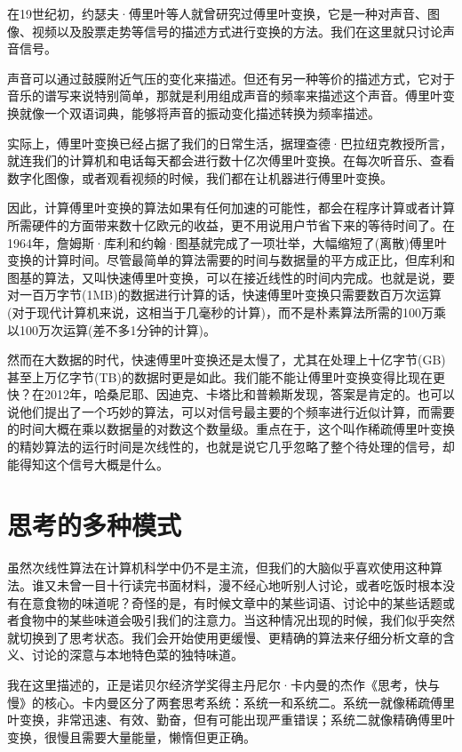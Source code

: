 在19世纪初，约瑟夫·傅里叶等人就曾研究过傅里叶变换，它是一种对声音、图像、视频以及股票走势等信号的描述方式进行变换的方法。我们在这里就只讨论声音信号。

声音可以通过鼓膜附近气压的变化来描述。但还有另一种等价的描述方式，它对于音乐的谱写来说特别简单，那就是利用组成声音的频率来描述这个声音。傅里叶变换就像一个双语词典，能够将声音的振动变化描述转换为频率描述。

实际上，傅里叶变换已经占据了我们的日常生活，据理查德·巴拉纽克教授所言，就连我们的计算机和电话每天都会进行数十亿次傅里叶变换。在每次听音乐、查看数字化图像，或者观看视频的时候，我们都在让机器进行傅里叶变换。

因此，计算傅里叶变换的算法如果有任何加速的可能性，都会在程序计算或者计算所需硬件的方面带来数十亿欧元的收益，更不用说用户节省下来的等待时间了。在1964年，詹姆斯·库利和约翰·图基就完成了一项壮举，大幅缩短了(离散)傅里叶变换的计算时间。尽管最简单的算法需要的时间与数据量的平方成正比，但库利和图基的算法，又叫快速傅里叶变换，可以在接近线性的时间内完成。也就是说，要对一百万字节(1MB)的数据进行计算的话，快速傅里叶变换只需要数百万次运算(对于现代计算机来说，这相当于几毫秒的计算)，而不是朴素算法所需的100万乘以100万次运算(差不多1分钟的计算)。

然而在大数据的时代，快速傅里叶变换还是太慢了，尤其在处理上十亿字节(GB)甚至上万亿字节(TB)的数据时更是如此。我们能不能让傅里叶变换变得比现在更快？在2012年，哈桑尼耶、因迪克、卡塔比和普赖斯发现，答案是肯定的。也可以说他们提出了一个巧妙的算法，可以对信号最主要的个频率进行近似计算，而需要的时间大概在乘以数据量的对数这个数量级。重点在于，这个叫作稀疏傅里叶变换的精妙算法的运行时间是次线性的，也就是说它几乎忽略了整个待处理的信号，却能得知这个信号大概是什么。

\section{思考的多种模式}

虽然次线性算法在计算机科学中仍不是主流，但我们的大脑似乎喜欢使用这种算法。谁又未曾一目十行读完书面材料，漫不经心地听别人讨论，或者吃饭时根本没有在意食物的味道呢？奇怪的是，有时候文章中的某些词语、讨论中的某些话题或者食物中的某些味道会吸引我们的注意力。当这种情况出现的时候，我们似乎突然就切换到了思考状态。我们会开始使用更缓慢、更精确的算法来仔细分析文章的含义、讨论的深意与本地特色菜的独特味道。

我在这里描述的，正是诺贝尔经济学奖得主丹尼尔·卡内曼的杰作《思考，快与慢》的核心。卡内曼区分了两套思考系统：系统一和系统二。系统一就像稀疏傅里叶变换，非常迅速、有效、勤奋，但有可能出现严重错误；系统二就像精确傅里叶变换，很慢且需要大量能量，懒惰但更正确。

